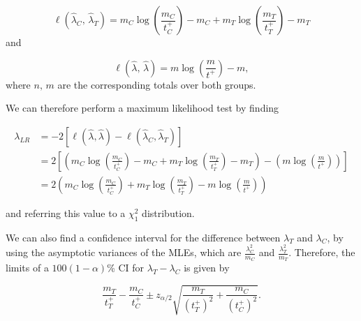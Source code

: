\documentclass[
  openany]{book}
\theoremstyle{definition}
\theoremstyle{definition}
\theoremstyle{definition}
\theoremstyle{definition}
\theoremstyle{remark}
\begin{document}
\[\ell\left(\hat{\lambda}_C,\,\hat{\lambda}_T\right) = m_C\log\left(\frac{m_C}{t^+_C}\right) - m_C + m_T\log\left(\frac{m_T}{t^+_T}\right) - m_T  \]
and

\[\ell\left(\hat\lambda,\,\hat\lambda\right) = m\log\left(\frac{m}{t^+}\right) - m,\]
where \(n,\,m\) are the corresponding totals over both groups.

We can therefore perform a maximum likelihood test by finding

\begin{align*}
\lambda_{LR}&  = -2\left[\ell\left(\hat{\lambda},\hat{\lambda}\right) - \ell\left(\hat{\lambda}_C,\hat{\lambda}_T\right)\right] \\
& = 2\left[\left(m_C\log\left(\frac{m_C}{t^+_C}\right) - m_C + m_T\log\left(\frac{m_T}{t^+_T}\right) - m_T \right) - \left(m\log\left(\frac{m}{t^+}\right)\right)\right]\\
& = 2\left(m_C\log\left(\frac{m_C}{t^+_C}\right) + m_T\log\left(\frac{m_T}{t^+_T}\right) - m\log\left(\frac{m}{t^+}\right)\right)
\end{align*}

and referring this value to a \(\chi^2_1\) distribution.

We can also find a confidence interval for the difference between \(\lambda_T\) and \(\lambda_C\), by using the asymptotic variances of the MLEs, which are \(\frac{\lambda_C^2}{m_C}\) and \(\frac{\lambda_T^2}{m_T}\). Therefore, the limits of a \(100\left(1-\alpha\right)\)\% CI for \(\lambda_T - \lambda_C\) is given by

\[ \frac{m_T}{t^+_T} - \frac{m_C}{t^+_C} \pm z_{\alpha/2}\sqrt{\frac{m_T}{\left(t^+_T\right)^2} + \frac{m_C}{\left(t^+_C\right)^2}}.\]
\end{document}
